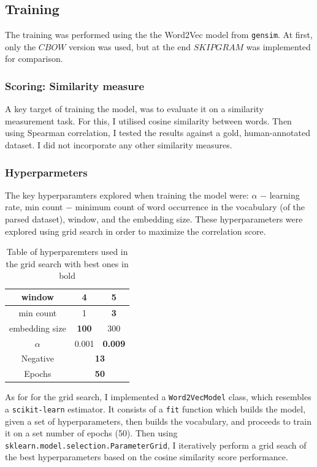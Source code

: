 \documentclass[12pt,a4paper]{article}
\begin{document}
\subsection{Training}
The training was performed using the the Word2Vec model from \texttt{gensim}.  At first, only the $CBOW$ version was used, but at the end $SKIPGRAM$ was implemented for comparison.

\subsubsection{Scoring: Similarity measure}
A key target of training the model, was to evaluate it on a similarity measurement task. For this, I utilised cosine similarity between words. Then using Spearman correlation, I tested the results against a gold, human-annotated dataset. I did not incorporate any other similarity measures. 

\subsubsection{Hyperparmeters}
The key hyperparamters explored when training the model were: $\alpha$ $-$ learning rate, min count $-$ minimum count of word occurrence in the vocabulary (of the parsed dataset), window, and the embedding size. These hyperparameters were explored using grid search in order to maximize the correlation score.
\begin{table}
\vspace{-25pt}
\caption{Table of hyperparemters used in the grid search with best ones in bold}\label{wrap-tab:1}
\centering
\begin{tabular}{|c|c|c|}
\hline
window & 4 & \textbf{5} \\ \hline
min count & 1 & \textbf{3} \\ \hline
embedding size & \textbf{100} & 300 \\ \hline
$\alpha$ & 0.001 & \textbf{0.009} \\ \hline
Negative & \multicolumn{2}{c|}{\textbf{13}} \\ \hline
Epochs & \multicolumn{2}{c|}{\textbf{50}} \\ \hline
\end{tabular}
\end{table} 
As for for the grid search, I implemented a \texttt{Word2VecModel} class, which resembles a \texttt{scikit-learn} estimator. It consists of a \texttt{fit} function which builds the model, given a set of hyperparameters, then builds the vocabulary, and proceeds to train it on a set number of epochs (50). Then using \texttt{sklearn.model.selection.ParameterGrid}, I iteratively perform a grid seach of the best hyperparameters based on the cosine similarity score performance.
\end{document}
